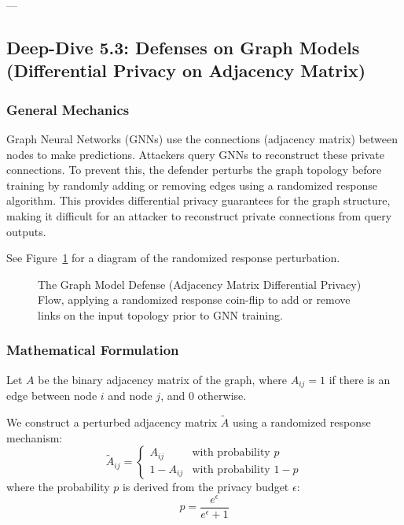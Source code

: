\documentclass{article}
\begin{document}
---

\subsection{Deep-Dive 5.3: Defenses on Graph Models (Differential Privacy on Adjacency Matrix)}

\subsubsection{General Mechanics}
Graph Neural Networks (GNNs) use the connections (adjacency matrix) between nodes to make predictions. Attackers query GNNs to reconstruct these private connections. To prevent this, the defender perturbs the graph topology before training by randomly adding or removing edges using a randomized response algorithm. This provides differential privacy guarantees for the graph structure, making it difficult for an attacker to reconstruct private connections from query outputs.

See Figure~\ref{fig:defense_graph_models} for a diagram of the randomized response perturbation.

\begin{figure}[htbp]
    \centering
    \caption{The Graph Model Defense (Adjacency Matrix Differential Privacy) Flow, applying a randomized response coin-flip to add or remove links on the input topology prior to GNN training.}
    \label{fig:defense_graph_models}
\end{figure}

\subsubsection{Mathematical Formulation}
Let $A$ be the binary adjacency matrix of the graph, where $A_{ij} = 1$ if there is an edge between node $i$ and node $j$, and $0$ otherwise. 

We construct a perturbed adjacency matrix $\tilde{A}$ using a randomized response mechanism:
\begin{equation}
    \tilde{A}_{ij} = 
    \begin{cases}
        A_{ij} & \text{with probability } p \\
        1 - A_{ij} & \text{with probability } 1 - p
    \end{cases}
\end{equation}
where the probability $p$ is derived from the privacy budget $\epsilon$:
\begin{equation}
    p = \frac{e^\epsilon}{e^\epsilon + 1}
\end{equation}
\end{document}
